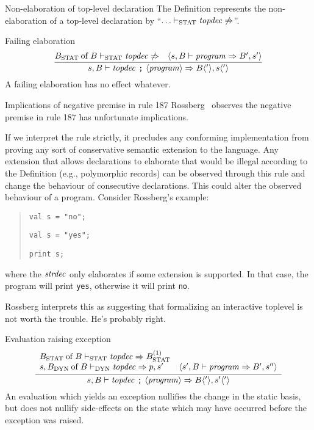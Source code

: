 \begin{convention}{Non-elaboration of top-level declaration}
The Definition represents the non-elaboration of a top-level declaration by
 ``$\ldots\vdash_{\rm STAT}\textit{topdec\/}\not\Rightarrow$''.
\end{convention}


\begin{inference-rule}{Failing elaboration}
\begin{equation}\label{rule:programs:}
\vcenter{\infer{\s,\B\ts\longprog\ra\B\optional{'},s\optional{'}}
  {\of{\Bstat}{\B}\tsstat\topdec\not\ra
    & \optional{\s,\B\ts\program\ra\B',s'}}}
\end{equation}
A failing elaboration has no effect whatever.
\end{inference-rule}

\begin{remark}{Implications of negative premise in rule 187}
Rossberg~\cite{rossberg2018defects} observes the negative premise in
rule 187 has unfortunate implications.

If we interpret the rule strictly, it precludes any conforming
implementation from proving any sort of conservative semantic extension
to the language. Any extension that allows declarations to elaborate
that would be illegal according to the Definition (e.g., polymorphic
records) can be observed through this rule and change the behaviour of
consecutive declarations. This could alter the observed behaviour of a
program. Consider Rossberg's example:
\begin{quote}\parskip=0pt
  \texttt{val s = "no";}

  \strdec

  \texttt{val s = "yes";}

  \texttt{print s;}
\end{quote}
where the $\textit{strdec\/}$ only elaborates if some extension is supported. In
that case, the program will print \texttt{yes}, otherwise it will print
\texttt{no}.

Rossberg interprets this as suggesting that formalizing an interactive
toplevel is not worth the trouble. He's probably right.
\end{remark}

\begin{inference-rule}{Evaluation raising exception}
\begin{equation}\label{rule:programs:evaluation-raising-exception}
\vcenter{\infer{\s,\B\ts\longprog\ra\B\optional{'},\s'\optional{'}}
  {\begin{array}{lr}
      \of{\Bstat}{\B}\tsstat\topdec\ra\Bstat^{(1)} & \\
      \s,\of{\Bdyn}{\B}\tsdyn\topdec\ra\p,\s' &
                  \optional{\s',\B\ts\program\ra\B',\s''}
   \end{array}}}
\end{equation}
An evaluation which yields an exception nullifies the change in the
static basis, but does not nullify side-effects on the state which may
have occurred before the exception was raised.
\end{inference-rule}

